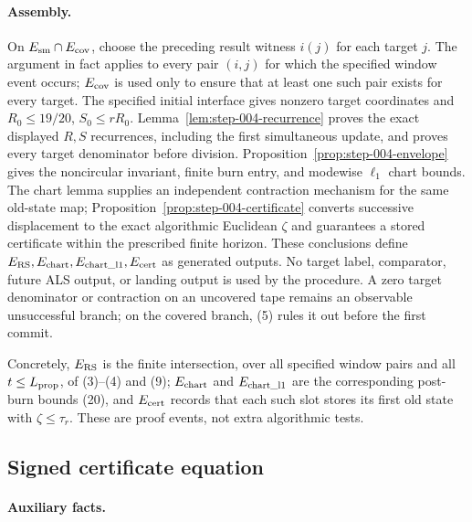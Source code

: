 \paragraph{Assembly.}

On \(E_{\rm sm}\cap E_{\rm cov}\), choose the preceding result witness \(i(j)\) for
each target \(j\). The argument in fact applies to every pair \((i,j)\) for
which the specified window event occurs; \(E_{\rm cov}\) is used only to
ensure that at least one such pair exists for every target. The specified initial interface gives nonzero target
coordinates and \(R_0\le19/20\), \(S_0\le rR_0\). Lemma~\ref{lem:step-004-recurrence}
proves the exact displayed \(R,S\) recurrences, including the first
simultaneous update, and proves every target denominator before division.
Proposition~\ref{prop:step-004-envelope} gives the noncircular invariant,
finite burn entry, and modewise \(\ell_1\) chart bounds. The chart lemma
supplies an independent contraction mechanism for the same old-state map;
Proposition~\ref{prop:step-004-certificate} converts successive displacement
to the exact algorithmic Euclidean \(\zeta\) and guarantees a stored
certificate within the prescribed finite horizon. These conclusions define
\(E_{\rm RS},E_{\rm chart},E_{\rm chart\_l1},E_{\rm cert}\) as generated
outputs. No target label, comparator, future ALS output, or landing output is
used by the procedure. A zero target denominator or contraction on an
uncovered tape remains an observable unsuccessful branch; on the covered
branch, (5) rules it out before the first commit.

Concretely, \(E_{\rm RS}\) is the finite intersection, over all specified window pairs and all \(t\le L_{\rm prop}\), of (3)--(4) and (9);
\(E_{\rm chart}\) and \(E_{\rm chart\_l1}\) are the corresponding post-burn
bounds (20), and \(E_{\rm cert}\) records that each such slot stores its
first old state with \(\zeta\le\tau_r\). These are proof events, not extra
algorithmic tests.

\subsection{Signed certificate equation}\label{app:step-005}

\paragraph{Auxiliary facts.}

